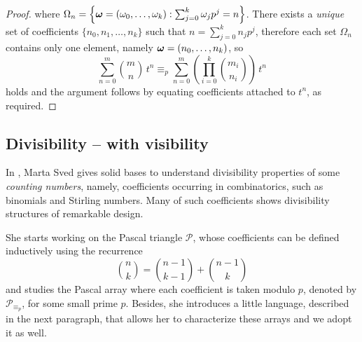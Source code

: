 \begin{proof}
    where $\Omega_{n}=\left\lbrace\boldsymbol{\omega}=\left(\omega_{0},\ldots,\omega_{k}\right):
        \sum_{j=0}^{k}{\omega_{j}p^{j}}=n\right\rbrace$.
    There exists a \emph{unique} set of coefficients
    $\lbrace n_{0},n_{1},\ldots,n_{k}\rbrace$ such that $n=\sum_{j=0}^{k}{n_{j}p^{j}}$, therefore
    each set $\Omega_{n}$ contains only one element, namely $\boldsymbol{\omega}=(n_{0},\ldots,n_{k})$, so
    \begin{displaymath}
        \sum_{n=0}^{m}{{{m}\choose{n}}\,t^{n}} 
        \equiv_{p} \sum_{n=0}^{m}{\left({\prod_{i=0}^{k}{{{m_{i}}\choose{n_{i}}}}}\right)\,t^{n}}
    \end{displaymath}
    holds and the argument follows by equating coefficients attached to $t^{n}$, 
    as required.

\end{proof}


\subsection{Divisibility -- with visibility}

In \cite{sved:1988}, Marta Sved gives solid bases to understand
divisibility properties of some \emph{counting numbers}, namely, coefficients
occurring in combinatorics, such as binomials and Stirling numbers. Many of
such coefficients shows divisibility structures of remarkable design. 

She starts working on the Pascal triangle $\mathcal{P}$, whose coefficients
can be defined inductively using the recurrence
\begin{equation}
    {{n}\choose{k}}={{n-1}\choose{k-1}}+{{n-1}\choose{k}}
    \label{eq:binomial:recurrence}
\end{equation}
and studies the Pascal array where each coefficient is taken modulo $p$, 
denoted by $\mathcal{P}_{\equiv_{p}}$, for some small prime $p$. Besides, 
she introduces a little language, described in the next paragraph, 
that allows her to characterize these arrays and we adopt it as well.

